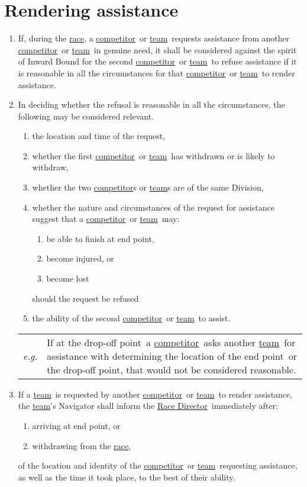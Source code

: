 \documentclass[12pt]{report}
\newcommand{\hyplink}[1]{\hyperlink{#1}{{#1}}}
\newcommand{\competitor}{\hyplink{competitor}}
\newcommand\dropoffpoint{drop-off point}
\newcommand{\eg}[1]{{\small
\begin{tabular}
  {p{0.3cm}p{11.75cm}}
  \emph{e.g.}&#1
\end{tabular}
}}
\newcommand\Endpoint{end point}
\newcommand{\race}{\hyplink{race}}
\newcommand{\RaceDirector}{\hyplink{Race Director}}
\newcommand{\team}{\hyplink{team}}
\begin{document}
  \section{Rendering assistance}
  \begin{enumerate}
    \item If, during the \race, a \competitor\ or \team\ requests assistance from another \competitor\ or \team\ in genuine need, it shall be considered against the spirit of Inward Bound for the second \competitor\ or \team\ to refuse assistance if it is reasonable in all the circumstances for that \competitor\ or \team\ to render assistance.
    \item In deciding whether the refusal is reasonable in all the circumstances, the following may be considered relevant.
    \begin{enumerate}
        \item the location and time of the request,
      \item whether the first \competitor\ or \team\ has withdrawn or is likely to withdraw,
      \item whether the two \competitor s  or \team s are of the same Division,
      \item whether the nature and circumstances of the request for assistance suggest that a \competitor\ or \team\ may:
      \begin{enumerate}
        \item be able to finish at \Endpoint,
        \item become injured, or
        \item become lost
      \end{enumerate}
      should the request be refused
      \item the ability of the second \competitor\ or \team\ to assist.
    \end{enumerate}
    \eg{If at the \dropoffpoint\ a \competitor\ asks another \team\ for assistance with determining the location of the \Endpoint\ or the \dropoffpoint, that would not be considered reasonable.}
    \item If a \team\ is requested by another \competitor\ or \team\ to render assistance, the \team's Navigator shall inform the \RaceDirector\ immediately after:
    \begin{enumerate}
      \item arriving at \Endpoint, or
      \item withdrawing from the \race,
    \end{enumerate}
    of the location and identity of the \competitor\ or \team\ requesting assistance, as well as the time it took place, to the best of their ability.
  \end{enumerate}
\end{document}
